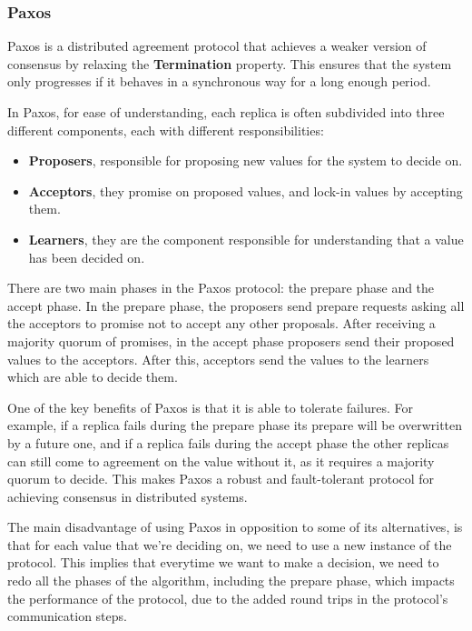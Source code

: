 \documentclass[sigconf]{acmart}
\begin{document}
\subsubsection{Paxos} 

Paxos is a distributed agreement protocol that achieves a weaker version of consensus by relaxing the \textbf{Termination} property. This ensures that the system only progresses if it behaves in a synchronous way for a long enough period.

In Paxos, for ease of understanding, each replica is often subdivided into three different components, each with different responsibilities:

\begin{itemize}
    \item \textbf{Proposers}, responsible for proposing new values for the system to decide on.
    \item \textbf{Acceptors}, they promise on proposed values, and lock-in values by accepting them.
    \item \textbf{Learners}, they are the component responsible for understanding that a value has been decided on. 
\end{itemize}

There are two main phases in the Paxos protocol: the prepare phase and the accept phase. In the prepare phase, the proposers send prepare requests asking all the acceptors to promise not to accept any other proposals. After receiving a majority quorum of promises, in the accept phase proposers send their proposed values to the acceptors. After this, acceptors send the values to the learners which are able to decide them.

One of the key benefits of Paxos is that it is able to tolerate failures. For example, if a replica fails during the prepare phase its prepare will be overwritten by a future one, and if a replica fails during the accept phase the other replicas can still come to agreement on the value without it, as it requires a majority quorum to decide. This makes Paxos a robust and fault-tolerant protocol for achieving consensus in distributed systems.

The main disadvantage of using Paxos in opposition to some of its alternatives, is that for each value that we're deciding on, we need to use a new instance of the protocol. This implies that everytime we want to make a decision, we need to redo all the phases of the algorithm, including the prepare phase, which impacts the performance of the protocol, due to the added round trips in the protocol's communication steps. 
\end{document}
